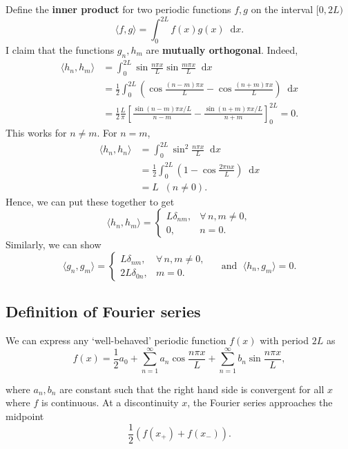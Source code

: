 \documentclass[12pt]{article}
\newcommand{\diff}{\mathop{}\!\mathrm{d}}
\theoremstyle{definition}
\theoremstyle{remark}
\begin{document}
Define the \textbf{inner product} for two periodic functions $f, g$ on the interval $[0, 2L)$ 
\[
	\langle f, g \rangle = \int_{0}^{2L}f(x) g(x)\diff x
.\]
I claim that the functions $g_n, h_m$ are \textbf{mutually orthogonal}. Indeed,
\begin{align*}
	\langle h_n, h_m \rangle &= \int_{0}^{2L} \sin \frac{n \pi x}{L} \sin \frac{m \pi x}{L}\diff x \\
				 &= \frac{1}{2} \int_{0}^{2L} \left( \cos \frac{(n - m)\pi x}{L} - \cos \frac{(n + m)\pi x}{L}\right)\diff x \\
				 &= \frac{1}{2} \frac{L}{\pi} \left[ \frac{\sin (n - m) \pi x/L}{n - m} - \frac{\sin (n + m) \pi x/L}{n + m} \right]_{0}^{2L} = 0.
\end{align*}
This works for $n \neq m$. For $n = m$,
\begin{align*}
	\langle h_n, h_n \rangle &= \int_{0}^{2L} \sin^2 \frac{n \pi x}{L}\diff x \\
				 &= \frac{1}{2} \int_{0}^{2L} \left( 1 - \cos \frac{2 \pi n x}{L} \right)\diff x \\
				 &= L \;\; (n \neq 0).
\end{align*}
Hence, we can put these together to get
\[
	\langle h_n, h_m \rangle =
	\begin{cases}
		L \delta_{nm}, & \forall\,\! n, m \neq 0, \\
		0, & n = 0.
	\end{cases}
\] 
Similarly, we can show
\[
	\langle g_n, g_m \rangle =
	\begin{cases}
		L \delta_{nm}, & \forall\,\! n, m \neq 0, \\
		2L \delta_{0n}, &m = 0.
	\end{cases}
	\quad \text{ and } \; \langle h_n, g_m \rangle = 0
.\]

\subsection{Definition of Fourier series}%
\label{sub:definition_of_fourier_series}

We can express any `well-behaved' periodic function $f(x)$ with period $2L$ as
\[
	f(x) = \frac{1}{2}a_0  + \sum_{n = 1}^{\infty} a_n \cos \frac{n \pi x}{L} + \sum_{n = 1}^{\infty}b_n \sin \frac{n \pi x}{L}
,\]

where $a_n, b_n$ are constant such that the right hand side is convergent for all $x$ where $f$ is continuous. At a discontinuity $x$, the Fourier series approaches the midpoint
\[
	\frac{1}{2} \left( f(x_{+}) + f(x_{-}) \right)
.\]
\end{document}

